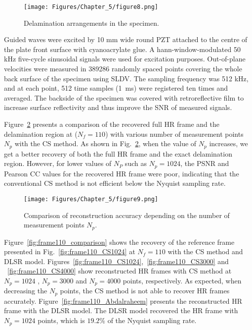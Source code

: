 \begin{figure} [!ht]
	\centering
	\texttt{[image: Figures/Chapter\_5/figure8.png]}
	\caption{Delamination arrangements in the specimen.}
	\label{fig:specimen}
\end{figure}

Guided waves were excited by 10 mm wide round PZT attached to the centre of the plate front surface with cyanoacrylate glue. 
A hann-window-modulated 50 kHz five-cycle sinusoidal signals were used for excitation purposes.
Out-of-plane velocities were measured in 389286 randomly spaced points covering the whole back surface of the specimen using SLDV. 
The sampling frequency was 512 kHz, and at each point, 512 time samples (1 ms) were registered ten times and averaged.
The backside of the specimen was covered with retroreflective film to increase surface reflectivity and thus improve the SNR of measured signals.

Figure~\ref{fig:points_metrics} presents a comparison of the recovered full HR frame and the delamination region at ($N_f=110$) with various number of measurement points $N_p$ with the CS method.
As shown in Fig.~\ref{fig:points_metrics}, when the value of $N_p$ increases, we get a better recovery of both the full HR frame and the exact delamination region.
However, for lower values of $N_P$ such as $N_p=1024$, the PSNR and Pearson CC values for the recovered HR frame were poor, indicating that the conventional CS method is not efficient below the Nyquist sampling rate.
\begin{figure} [h!]
	\centering
	\texttt{[image: Figures/Chapter\_5/figure9.png]}
	\caption{Comparison of reconstruction accuracy depending on the number of measurement points $N_p$.}
	\label{fig:points_metrics}
\end{figure}

Figure~\ref{fig:frame110_comparison} shows the recovery of the reference frame presented in Fig.~\ref{fig:frame110_CS1024} at $N_f=110$ with the CS method and DLSR model.
Figures~\ref{fig:frame110_CS1024},~\ref{fig:frame110_CS3000} and ~\ref{fig:frame110_CS4000} show reconstructed HR frames with CS method at $N_p=1024$ , $N_p=3000$ and $N_p=4000$ points, respectively.
As expected, when decreasing the $N_p$ points, the CS method is not able to recover HR frames accurately.
Figure~\ref{fig:frame110_Abdalraheem} presents the reconstructed HR frame with the DLSR model.
The DLSR model recovered the HR frame with $N_p=1024$ points, which is \(19.2\%\) of the Nyquist sampling rate.

